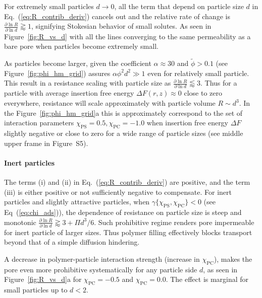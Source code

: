 \documentclass[12pt, a4paper]{article}
\begin{document}
For extremely small particles $d \to 0$, all the term that depend on particle size $d$ in Eq.~(\ref{eq:R_contrib_deriv}) cancels out and the relative rate of change is $\frac{\partial \ln R}{\partial \ln d} \gtrapprox  1$, signifying Stokesian behavior of small solutes.
As seen in Figure~\ref{fig:R_vs_d} with all the lines converging to the same permeability as a bare pore when particles become extremely small.

As particles become larger, given the coefficient $\alpha \approx 30$ and $\tilde{\phi}>0.1$ (see Figure~\ref{fig:phi_hm_grid}) assures $\alpha\phi^2d^2 \gg 1$ even for relatively small particle.
This result in a resistance scaling with particle size as $\frac{\partial \ln R}{\partial \ln d} \lessapprox 3$.
Thus for a particle with average insertion free energy $\Delta F(r, z) \approx 0$ close to zero everywhere, resistance will scale approximately with particle volume $R \sim d^3$.
In the Figure~\ref{fig:phi_hm_grid}a this is approximately correspond to the set of interaction parameters $\chi_{\text{PS}} = 0.5, \chi_{\text{PC}} = -1.0$ when insertion free energy $\Delta F$ slightly negative or close to zero for a wide range of particle sizes (see middle upper frame in Figure~S5).


\paragraph{Inert particles}
The terms (i) and (ii) in Eq.~(\ref{eq:R_contrib_deriv}) are positive, and the term (iii) is either positive or not sufficiently negative to compensate.
For inert particles and slightly attractive particles, when $\gamma\{\chi_{\text{PS}}, \chi_{\text{PC}}\}<0$ (see Eq~(\ref{eq:chi_ads})), the dependence of resistance on particle size is steep and monotonic $\frac{\partial \ln R}{\partial \ln d} \gtrapprox 3 + \Pi d^{3}/6$.
Such prohibitive regime renders pore impermeable for inert particle of larger sizes.
Thus polymer filling effectively blocks transport beyond that of a simple diffusion hindering.

A decrease in polymer-particle interaction strength (increase in $\chi_{\text{PC}}$), makes the pore even more prohibitive systematically for any particle side $d$, as seen in Figure~\ref{fig:R_vs_d}a for $\chi_{\text{PC}} = -0.5$ and $\chi_{\text{PC}} = 0.0$.
The effect is marginal for small particles up to $d < 2$.
\end{document}
